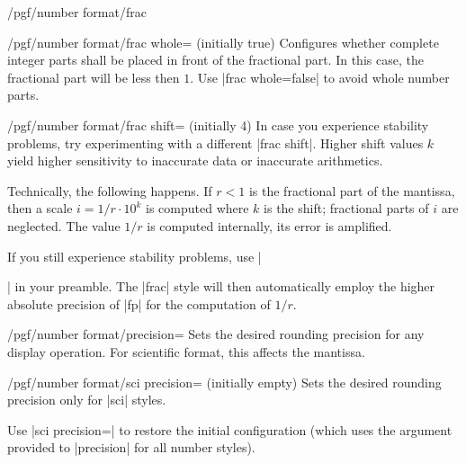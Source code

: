 \begin{key}{/pgf/number format/frac}
    \begin{key}{/pgf/number format/frac whole= (initially true)}
        Configures whether complete integer parts shall be placed in front of
        the fractional part. In this case, the fractional part will be less
        then $1$. Use |frac whole=false| to avoid whole number parts.
\begin{codeexample}[pre={\begin{lateximage}},post={\end{lateximage}},width=3cm]
\hspace{1em}
\hspace{1em}
\hspace{1em}
\hspace{1em}
\hspace{1em}
\end{codeexample}
    \end{key}

    \begin{key}{/pgf/number format/frac shift= (initially 4)}
        In case you experience stability problems, try experimenting with a
        different |frac shift|. Higher shift values $k$ yield higher
        sensitivity to inaccurate data or inaccurate arithmetics.

        Technically, the following happens. If $r < 1$ is the fractional part
        of the mantissa, then a scale $i = 1/r \cdot 10^k$ is computed where
        $k$ is the shift; fractional parts of $i$ are neglected. The value
        $1/r$ is computed internally, its error is amplified.

        If you still experience stability problems, use |\usepackage{fp}| in
        your preamble. The |frac| style will then automatically employ the
        higher absolute precision of |fp| for the computation of $1/r$.
    \end{key}
\end{key}

\begin{key}{/pgf/number format/precision=}
    Sets the desired rounding precision for any display operation. For
    scientific format, this affects the mantissa.
\end{key}

\begin{key}{/pgf/number format/sci precision= (initially empty)}
    Sets the desired rounding precision only for |sci| styles.

    Use |sci precision={}| to restore the initial configuration (which uses the
    argument provided to |precision| for all number styles).
\end{key}

